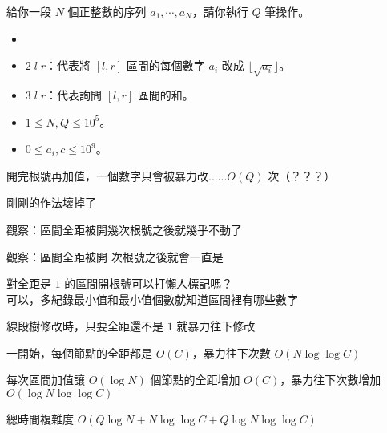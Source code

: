 \begin{frame}{}
    \begin{problem}
        給你一段 $N$ 個正整數的序列 $a_1,\cdots,a_N$，請你執行 $Q$ 筆操作。

        \begin{itemize}
            \item {}
            \item $2\;l\;r$：代表將 $[l,r]$ 區間的每個數字 $a_i$ 改成 $\lfloor{\sqrt{a_i}}\rfloor$。
            \item $3\;l\;r$：代表詢問 $[l,r]$ 區間的和。
        \end{itemize}

        \begin{itemize}
            \item $1\le N,Q\le 10^5$。
            \item $0\le a_i,c\le 10^9$。
        \end{itemize}
    \end{problem}
\end{frame}

\begin{frame}{}
    開完根號再加值，一個數字只會被暴力改......$O(Q)$ 次（？？？）

    剛剛的作法壞掉了
\end{frame}

\begin{frame}{}
     {
        觀察：區間全距被開幾次根號之後就幾乎不動了
    }

     {
        觀察：區間全距被開  次根號之後就會一直是 

        對全距是 $1$ 的區間開根號可以打懶人標記嗎？\\
        可以，多紀錄最小值和最小值個數就知道區間裡有哪些數字

        線段樹修改時，只要全距還不是 $1$ 就暴力往下修改
    }
\end{frame}

\begin{frame}{}
    一開始，每個節點的全距都是 $O(C)$，暴力往下次數 $O(N \log\log C)$

    每次區間加值讓 $O(\log N)$ 個節點的全距增加 $O(C)$，暴力往下次數增加 $O(\log N \log\log C)$

    總時間複雜度 $O(Q \log N + N \log\log C + Q \log N \log\log C)$
\end{frame}


